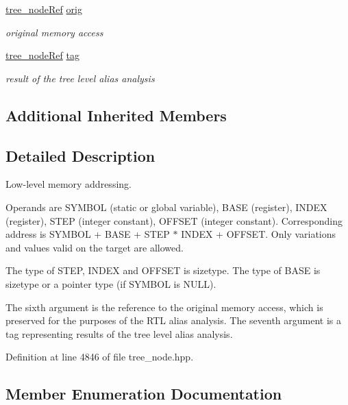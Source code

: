 \begin{DoxyCompactItemize}
\hyperlink{tree__node_8hpp_a6ee377554d1c4871ad66a337eaa67fd5}{tree\+\_\+node\+Ref} \hyperlink{structtarget__mem__ref_ad7127ce0c61cf77d8bbca967976ae05f}{orig}
\begin{DoxyCompactList}\small\item\em original memory access \end{DoxyCompactList}\item 
\hyperlink{tree__node_8hpp_a6ee377554d1c4871ad66a337eaa67fd5}{tree\+\_\+node\+Ref} \hyperlink{structtarget__mem__ref_a512eccf46776e6cc79b74577a1e825d9}{tag}
\begin{DoxyCompactList}\small\item\em result of the tree level alias analysis \end{DoxyCompactList}\end{DoxyCompactItemize}
\subsection*{Additional Inherited Members}


\subsection{Detailed Description}
Low-\/level memory addressing. 

Operands are S\+Y\+M\+B\+OL (static or global variable), B\+A\+SE (register), I\+N\+D\+EX (register), S\+T\+EP (integer constant), O\+F\+F\+S\+ET (integer constant). Corresponding address is S\+Y\+M\+B\+OL + B\+A\+SE + S\+T\+EP $\ast$ I\+N\+D\+EX + O\+F\+F\+S\+ET. Only variations and values valid on the target are allowed.

The type of S\+T\+EP, I\+N\+D\+EX and O\+F\+F\+S\+ET is sizetype. The type of B\+A\+SE is sizetype or a pointer type (if S\+Y\+M\+B\+OL is N\+U\+LL).

The sixth argument is the reference to the original memory access, which is preserved for the purposes of the R\+TL alias analysis. The seventh argument is a tag representing results of the tree level alias analysis. 

Definition at line 4846 of file tree\+\_\+node.\+hpp.



\subsection{Member Enumeration Documentation}
\mbox{\label{structtarget__mem__ref_aa8e359386da90822485e77b6500859cc}} 
